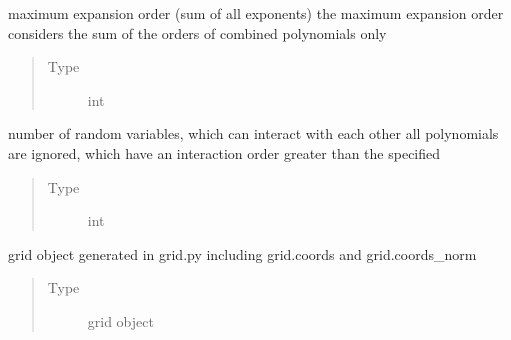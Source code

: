 \documentclass[letterpaper,10pt,english,openany,oneside]{sphinxmanual}
\begin{document}
\begin{fulllineitems}
\begin{fulllineitems}
\begin{quote}
\begin{description}
\end{description}\end{quote}

\end{fulllineitems}


\begin{fulllineitems}
\label{\detokenize{pygpc:pygpc.reg.Reg.order_max}}
maximum expansion order (sum of all exponents)
the maximum expansion order considers the sum of the orders of combined polynomials only
\begin{quote}\begin{description}
\item[{Type}] \leavevmode
int

\end{description}\end{quote}

\end{fulllineitems}


\begin{fulllineitems}
\label{\detokenize{pygpc:pygpc.reg.Reg.interaction_order}}
number of random variables, which can interact with each other
all polynomials are ignored, which have an interaction order greater than the specified
\begin{quote}\begin{description}
\item[{Type}] \leavevmode
int

\end{description}\end{quote}

\end{fulllineitems}


\begin{fulllineitems}
\label{\detokenize{pygpc:pygpc.reg.Reg.grid}}
grid object generated in grid.py including grid.coords and grid.coords\_norm
\begin{quote}\begin{description}
\item[{Type}] \leavevmode
grid object


\end{description}
\end{quote}
\end{fulllineitems}
\end{fulllineitems}
\end{document}
